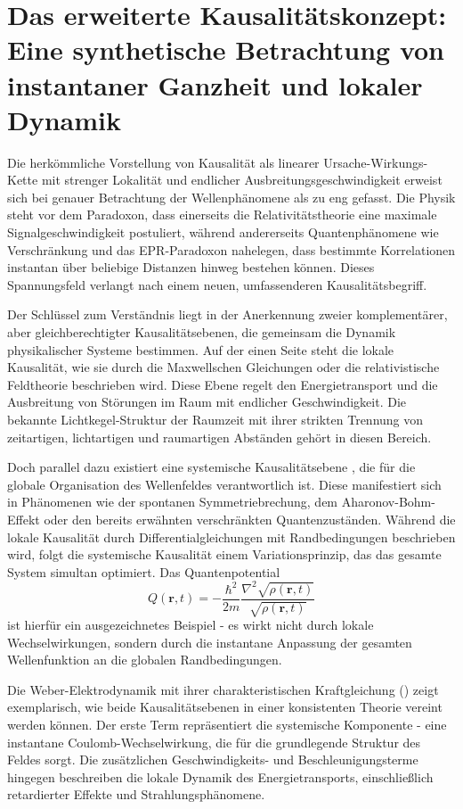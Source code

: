 \section{Das erweiterte Kausalitätskonzept: Eine synthetische Betrachtung von instantaner Ganzheit und lokaler Dynamik}
Die herkömmliche Vorstellung von Kausalität als linearer Ursache-Wirkungs-Kette mit strenger Lokalität und endlicher Ausbreitungsgeschwindigkeit erweist sich bei genauer Betrachtung
der Wellenphänomene als zu eng gefasst. Die Physik steht vor dem Paradoxon, dass einerseits die Relativitätstheorie eine maximale Signalgeschwindigkeit postuliert, während andererseits
Quantenphänomene wie Verschränkung und das EPR-Paradoxon nahelegen, dass bestimmte Korrelationen instantan über beliebige Distanzen hinweg bestehen können. Dieses Spannungsfeld verlangt
nach einem neuen, umfassenderen Kausalitätsbegriff.

Der Schlüssel zum Verständnis liegt in der Anerkennung zweier komplementärer, aber gleichberechtigter Kausalitätsebenen, die gemeinsam die Dynamik physikalischer Systeme bestimmen.
Auf der einen Seite steht die lokale Kausalität, wie sie durch die Maxwellschen Gleichungen oder die relativistische Feldtheorie beschrieben wird. Diese Ebene regelt den Energietransport
und die Ausbreitung von Störungen im Raum mit endlicher Geschwindigkeit. Die bekannte Lichtkegel-Struktur der Raumzeit mit ihrer strikten Trennung von zeitartigen, lichtartigen und
raumartigen Abständen gehört in diesen Bereich.

Doch parallel dazu existiert eine systemische Kausalitätsebene \cite{Valentini2010}, die für die globale Organisation des Wellenfeldes verantwortlich ist. Diese manifestiert sich in Phänomenen wie der
spontanen Symmetriebrechung, dem Aharonov-Bohm-Effekt oder den bereits erwähnten verschränkten Quantenzuständen. Während die lokale Kausalität durch Differentialgleichungen mit
Randbedingungen beschrieben wird, folgt die systemische Kausalität einem Variationsprinzip, das das gesamte System simultan optimiert.
Das Quantenpotential
\[
Q(\mathbf{r},t) = -\frac{\hbar^2}{2m} \frac{\nabla^2 \sqrt{\rho(\mathbf{r},t)}}{\sqrt{\rho(\mathbf{r},t)}}
\]
ist hierfür ein ausgezeichnetes Beispiel - es wirkt nicht durch lokale Wechselwirkungen, sondern durch die instantane Anpassung der gesamten
Wellenfunktion an die globalen Randbedingungen.

Die Weber-Elektrodynamik mit ihrer charakteristischen Kraftgleichung () zeigt exemplarisch, wie beide Kausalitätsebenen in einer konsistenten Theorie vereint werden können.
Der erste Term repräsentiert die systemische Komponente - eine instantane Coulomb-Wechselwirkung, die für die grundlegende Struktur des Feldes sorgt. Die zusätzlichen Geschwindigkeits- und
Beschleunigungsterme hingegen beschreiben die lokale Dynamik des Energietransports, einschließlich retardierter Effekte und Strahlungsphänomene.

